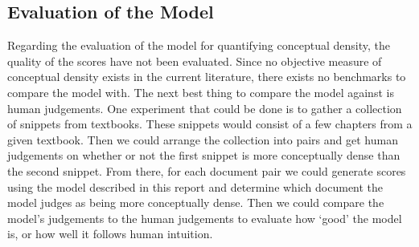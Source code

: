\documentclass[12pt]{article}
\theoremstyle{grammarstyle}
\begin{document}
\subsection{Evaluation of the Model} \label{sec:evaluation_of_the_model}
Regarding the evaluation of the model for quantifying conceptual density, the quality of the scores have not been evaluated. Since no objective measure of conceptual density exists in the current literature, there exists no benchmarks to compare the model with. The next best thing to compare the model against is human judgements. One experiment that could be done is to gather a collection of snippets from textbooks. These snippets would consist of a few chapters from a given textbook. Then we could arrange the collection into pairs and get human judgements on whether or not the first snippet is more conceptually dense than the second snippet. From there, for each document pair we could generate scores using the model described in this report and determine which document the model judges as being more conceptually dense. Then we could compare the model's judgements to the human judgements to evaluate how `good' the model is, or how well it follows human intuition.


\end{document}
